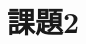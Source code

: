 \documentclass[a4paper,12pt]{jarticle}
\begin{document}
\section*{課題2}
\begin{comment}
次の文法、
\begin{enumerate}
\renewcommand{\labelenumi}{(\arabic{enumi})}
\item $ E \rightarrow \left( E \right) $
\item $ | F $
\item $ | C $
\item $ | V $
\item $ V \rightarrow I X $
\item $ X \rightarrow [ E ] $
\item $ | \epsilon $
\item $ F \rightarrow I \left( L \right)$
\item $ L \rightarrow E T $
\item $ | \epsilon $
\item $ T \rightarrow , E T $
\item $ | \epsilon$
\end{enumerate}
についての問に答えよ。ただし、$ I $と$ C $は終端記号であるとする。また、過程の詳細も示せ。
\end{comment}
\end{document}
